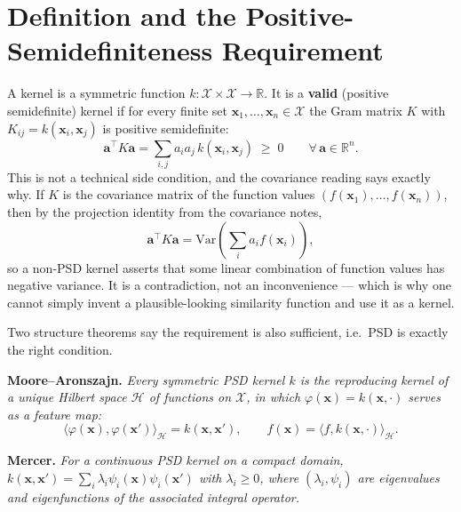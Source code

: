 \documentclass[conference]{IEEEtran}
\begin{document}
\section*{Definition and the Positive-Semidefiniteness Requirement}
A kernel is a symmetric function $k : \mathcal{X}\times\mathcal{X} \to \mathbb{R}$. It is a \textbf{valid} (positive semidefinite) kernel if for every finite set $\mathbf{x}_1,\dots,\mathbf{x}_n \in \mathcal{X}$ the Gram matrix $K$ with $K_{ij} = k(\mathbf{x}_i,\mathbf{x}_j)$ is positive semidefinite:
\begin{equation}
    \mathbf{a}^{\!\top}K\mathbf{a} = \sum_{i,j} a_i a_j\, k(\mathbf{x}_i,\mathbf{x}_j) \;\geq\; 0
    \qquad \forall\, \mathbf{a} \in \mathbb{R}^n .
\end{equation}
This is not a technical side condition, and the covariance reading says exactly why. If $K$ is the covariance matrix of the function values $(f(\mathbf{x}_1),\dots,f(\mathbf{x}_n))$, then by the projection identity from the covariance notes,
\begin{equation}
    \mathbf{a}^{\!\top}K\mathbf{a} = \mathrm{Var}\!\left(\textstyle\sum_i a_i f(\mathbf{x}_i)\right),
\end{equation}
so a non-PSD kernel asserts that some linear combination of function values has negative variance. It is a contradiction, not an inconvenience --- which is why one cannot simply invent a plausible-looking similarity function and use it as a kernel.

Two structure theorems say the requirement is also sufficient, i.e.\ PSD is exactly the right condition.

\medskip
\noindent\textbf{Moore--Aronszajn.}
\textit{Every symmetric PSD kernel $k$ is the reproducing kernel of a unique Hilbert space $\mathcal{H}$ of functions on $\mathcal{X}$, in which $\varphi(\mathbf{x}) = k(\mathbf{x},\cdot)$ serves as a feature map:}
\begin{equation}
    \langle \varphi(\mathbf{x}), \varphi(\mathbf{x}')\rangle_{\mathcal{H}} = k(\mathbf{x},\mathbf{x}'),
    \qquad
    f(\mathbf{x}) = \langle f, k(\mathbf{x},\cdot)\rangle_{\mathcal{H}} .
\end{equation}

\medskip
\noindent\textbf{Mercer.}
\textit{For a continuous PSD kernel on a compact domain, $k(\mathbf{x},\mathbf{x}') = \sum_i \lambda_i \psi_i(\mathbf{x})\psi_i(\mathbf{x}')$ with $\lambda_i \geq 0$, where $(\lambda_i,\psi_i)$ are eigenvalues and eigenfunctions of the associated integral operator.}
\end{document}
